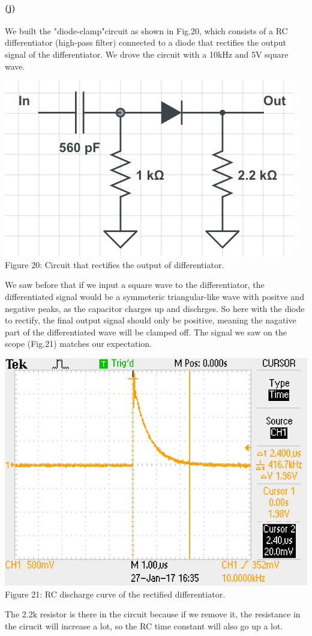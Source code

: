\documentclass[]{article}
\begin{document}
	\paragraph{ (j)} 	
	We built the "diode-clamp"circuit as shown in Fig.20, which consists of a RC differentiator (high-pass filter) connected to a diode that rectifies the output signal of the differentiator. We drove the circuit with a 10kHz and 5V square wave.
	\begin{center}
		\includegraphics[scale=0.4]{j_circuit}\\
		Figure 20: Circuit that rectifies the output of differentiator.
	\end{center}
	We saw before that if we input a square wave to the differentiator, the differentiated signal would be a symmeteric triangular-like wave with positve and negative peaks, as the capacitor charges up and dischrges. So here with the diode to rectify, the final output signal should only be positive, meaning the nagative part of the differentiated wave will be clamped off. The signal we saw on the scope (Fig.21) matches our expectation. 
		\begin{center}
			\includegraphics[scale=0.8]{j_rcdischarge}\\
			Figure 21: RC discharge curve of the rectified differentiator.
		\end{center}
The 2.2k resistor is there in the circuit because if we remove it, the resistance in the cirucit will increase a lot, so the RC time constant will also go up a lot. 
\end{document}
